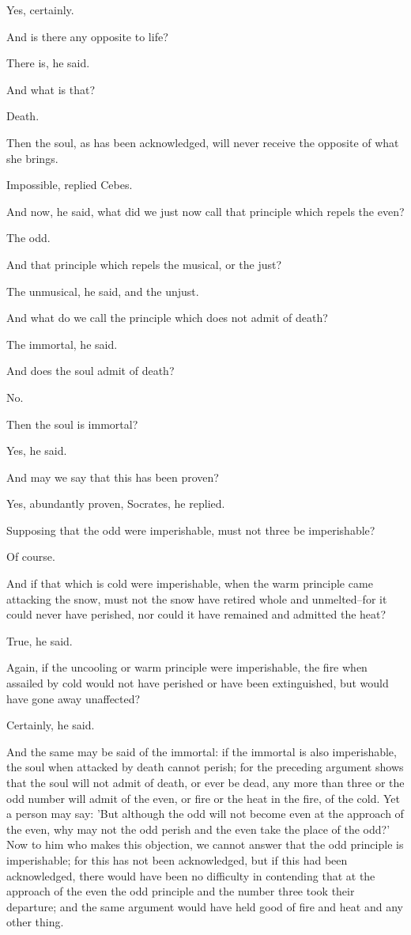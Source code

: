 Yes, certainly.

And is there any opposite to life?

There is, he said.

And what is that?

Death.

Then the soul, as has been acknowledged, will never receive the opposite
of what she brings.

Impossible, replied Cebes.

And now, he said, what did we just now call that principle which repels
the even?

The odd.

And that principle which repels the musical, or the just?

The unmusical, he said, and the unjust.

And what do we call the principle which does not admit of death?

The immortal, he said.

And does the soul admit of death?

No.

Then the soul is immortal?

Yes, he said.

And may we say that this has been proven?

Yes, abundantly proven, Socrates, he replied.

Supposing that the odd were imperishable, must not three be
imperishable?

Of course.

And if that which is cold were imperishable, when the warm principle
came attacking the snow, must not the snow have retired whole and
unmelted--for it could never have perished, nor could it have remained
and admitted the heat?

True, he said.

Again, if the uncooling or warm principle were imperishable, the fire
when assailed by cold would not have perished or have been extinguished,
but would have gone away unaffected?

Certainly, he said.

And the same may be said of the immortal: if the immortal is also
imperishable, the soul when attacked by death cannot perish; for the
preceding argument shows that the soul will not admit of death, or ever
be dead, any more than three or the odd number will admit of the even,
or fire or the heat in the fire, of the cold. Yet a person may say: 'But
although the odd will not become even at the approach of the even, why
may not the odd perish and the even take the place of the odd?' Now to
him who makes this objection, we cannot answer that the odd principle is
imperishable; for this has not been acknowledged, but if this had been
acknowledged, there would have been no difficulty in contending that
at the approach of the even the odd principle and the number three took
their departure; and the same argument would have held good of fire and
heat and any other thing.

